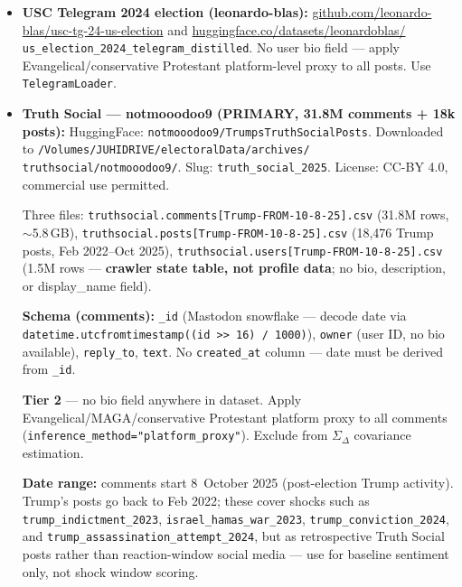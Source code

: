 \documentclass[11pt]{article}
\begin{document}
\begin{taskbox}
{\begin{itemize}[leftmargin=1.6em, itemsep=1pt]
          \url{gvrkiran.github.io/polarizationTwitter/}.
          \textbf{High priority.} Add bio text + ideological label to
          \texttt{data/bio\_labels/labeled\_bios.jsonl} before SetFit
          training (Week 4 Day 3).
    \item \textbf{USC Telegram 2024 election (leonardo-blas):}
          \url{github.com/leonardo-blas/usc-tg-24-us-election} and
          \url{huggingface.co/datasets/leonardoblas/}\allowbreak
          \texttt{us\_election\_2024\_telegram\_distilled}.
          No user bio field --- apply Evangelical/conservative Protestant
          platform-level proxy to all posts. Use \texttt{TelegramLoader}.
    \item \textbf{Truth Social --- notmooodoo9 (PRIMARY, 31.8M comments + 18k posts):}
          HuggingFace: \texttt{notmooodoo9/TrumpsTruthSocialPosts}.
          Downloaded to \texttt{/Volumes/JUHIDRIVE/electoralData/archives/}\allowbreak
          \texttt{truthsocial/notmooodoo9/}. Slug: \texttt{truth\_social\_2025}.
          License: CC-BY 4.0, commercial use permitted.

          \smallskip
          Three files: \texttt{truthsocial.comments[Trump-FROM-10-8-25].csv}
          (31.8M rows, $\sim$5.8\,GB),
          \texttt{truthsocial.posts[Trump-FROM-10-8-25].csv}
          (18,476 Trump posts, Feb 2022--Oct 2025),
          \texttt{truthsocial.users[Trump-FROM-10-8-25].csv}
          (1.5M rows --- \textbf{crawler state table, not profile data};
          no bio, description, or display\_name field).

          \smallskip
          \textbf{Schema (comments):} \texttt{\_id} (Mastodon snowflake ---
          decode date via \texttt{datetime.utcfromtimestamp((id >> 16) / 1000)}),
          \texttt{owner} (user ID, no bio available),
          \texttt{reply\_to},
          \texttt{text}.
          No \texttt{created\_at} column --- date must be derived from
          \texttt{\_id}.

          \smallskip
          \textbf{Tier 2} --- no bio field anywhere in dataset.
          Apply Evangelical/MAGA/conservative Protestant platform proxy to all
          comments (\texttt{inference\_method="platform\_proxy"}).
          Exclude from $\Sigma_\Delta$ covariance estimation.

          \smallskip
          \textbf{Date range:} comments start 8~October 2025 (post-election
          Trump activity). Trump's posts go back to Feb 2022; these cover
          shocks such as \texttt{trump\_indictment\_2023},
          \texttt{israel\_hamas\_war\_2023}, \texttt{trump\_conviction\_2024},
          and \texttt{trump\_assassination\_attempt\_2024}, but as
          retrospective Truth Social posts rather than reaction-window
          social media --- use for baseline sentiment only, not shock window
          scoring.


\end{itemize}}
\end{taskbox}
\end{document}
